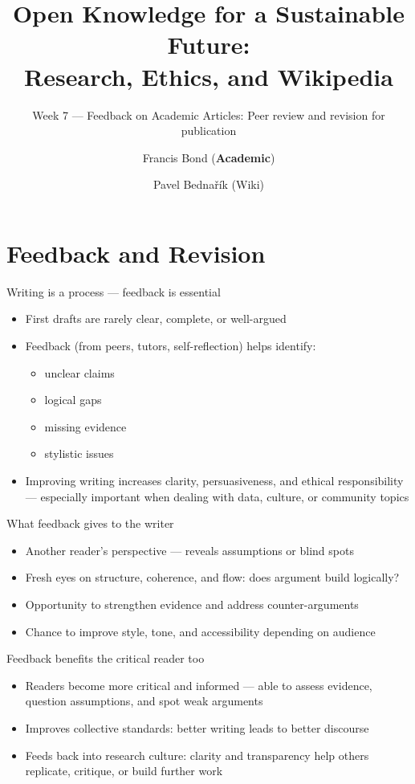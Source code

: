 \documentclass[aspectratio=169]{beamer}
\title[Feedback]{Open Knowledge for a Sustainable Future:\\ Research, Ethics, and Wikipedia}
\subtitle{Week 7 — Feedback on Academic Articles: Peer review and revision for publication}
\author[Bond \& Bednařík]{Francis Bond (\textbf{Academic}) \and Pavel Bednařík (Wiki)}
\institute[UPOL \& Wikimedia]{Palacký University Olomouc \quad | \quad Wikimedia ČR}
\date{}
\begin{document}
\begin{frame}
  \titlepage
\end{frame}

\section{Feedback and Revision}

\begin{frame}{Writing is a process — feedback is essential}
\begin{itemize}
  \item First drafts are rarely clear, complete, or well-argued
  \item Feedback (from peers, tutors, self-reflection) helps identify:
    \begin{itemize}
    \item unclear claims
    \item logical gaps
    \item missing evidence
    \item stylistic issues
    \end{itemize}
  \item Improving writing increases clarity, persuasiveness, and ethical responsibility — especially important when dealing with data, culture, or community topics
\end{itemize}
\end{frame}

\begin{frame}{What feedback gives to the writer}
\begin{itemize}
  \item Another reader's perspective — reveals assumptions or blind spots
  \item Fresh eyes on structure, coherence, and flow: does argument build logically?
  \item Opportunity to strengthen evidence and address counter-arguments
  \item Chance to improve style, tone, and accessibility depending on audience
\end{itemize}
\end{frame}

\begin{frame}{Feedback benefits the critical reader too}
\begin{itemize}
  \item Readers become more critical and informed — able to assess evidence, question assumptions, and spot weak arguments
  \item Improves collective standards: better writing leads to better discourse
  \item Feeds back into research culture: clarity and transparency help others replicate, critique, or build further work
\end{itemize}
\end{frame}
\end{document}

